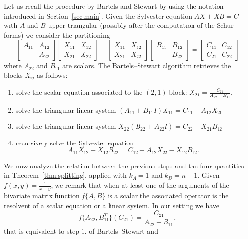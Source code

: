 \documentclass{siamart1116}
\begin{document}
Let us recall the procedure by Bartels and Stewart by using the notation introduced in Section~\ref{sec:main}. Given the Sylvester equation $AX+XB=C$ with $A$ and $B$ upper triangular (possibly after the computation of the Schur forms) we consider the partitioning
\begin{equation}\label{eq:bartels}
 \begin{bmatrix}
 A_{11}&A_{12}\\
 &A_{22}
 \end{bmatrix}
 \begin{bmatrix}
 X_{11}&X_{12}\\
 X_{21}&X_{22}
 \end{bmatrix}+
 \begin{bmatrix}
 X_{11}&X_{12}\\
 X_{21}&X_{22}
 \end{bmatrix}\begin{bmatrix}
 B_{11}&B_{12}\\
 &B_{22}
 \end{bmatrix}=\begin{bmatrix}
 C_{11}&C_{12}\\
 C_{21}&C_{22}
 \end{bmatrix}
\end{equation}
where $A_{22}$ and $B_{11}$ are scalars. The Bartels--Stewart algorithm retrieves the blocks $X_{ij}$ as follows:
\begin{enumerate}
    \item solve the scalar equation associated to the $(2,1)$ block: $X_{21}= \frac{C_{21}}{A_{22}+B_{11}}$,
    \item solve the triangular linear system $(A_{11}+ B_{11}I)X_{11} = C_{11}-A_{12}X_{21} $
    \item solve the triangular linear system $X_{22}(B_{22}+ A_{22}I) = C_{22}-X_{21}B_{12} $
    \item recursively solve the Sylvester equation $$A_{11}X_{12}+X_{12}B_{22} = C_{12}-A_{12}X_{22}-X_{12}B_{12}.$$
\end{enumerate}
We now analyze the relation between  the previous steps and the four quantities in Theorem~\ref{thm:splitting}, applied with $k_A = 1$ and $k_B=n-1$. Given $f(x,y)=\frac{1}{x+y}$, we remark that when at least one of the arguments of the bivariate matrix function $f\{A,B\}$ is a scalar the associated operator is the resolvent of a scalar equation or a linear system. In our setting we have
$$
    f\{A_{22},B_{11}^T\}(C_{21})=\frac{C_{21}}{A_{22}+B_{11}},$$
    that is equivalent to step 1. of Bartels--Stewart and
\end{document}
